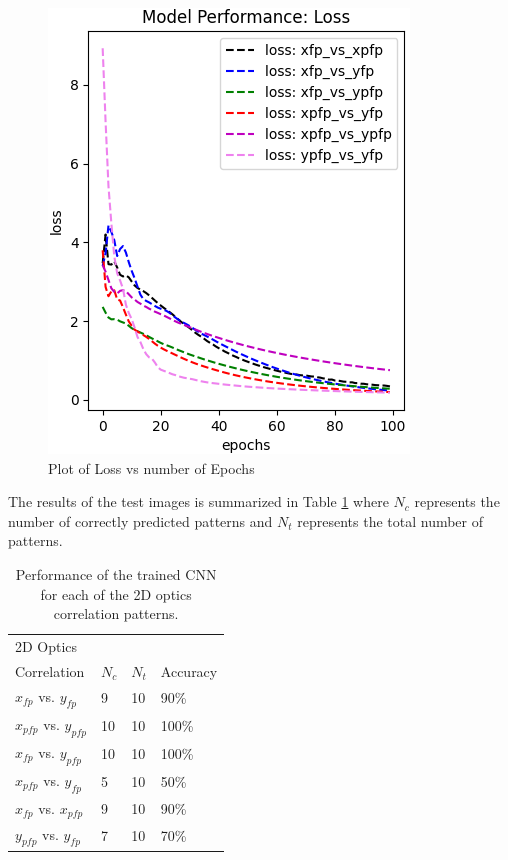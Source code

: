 \documentclass[conference]{IEEEtran}
\begin{document}
\begin{figure}[ht!]
  \centering
  \includegraphics[scale=0.6]{images/Results_part2.png}
  \caption{Plot of Loss vs number of Epochs}
  \label{fig:Results_part2}
\end{figure}

The results of the test images is summarized in Table  \ref{tab:results} where $N_{c}$ represents the number of correctly predicted patterns and $N_{t}$ represents the total number of patterns.
\begin{table}[h]
	\begin{center}
		\begin{tabular}{ p{2cm}p{1cm}p{1cm}p{1cm}  } %
                  \hline
                  2D Optics \\Correlation  & $N_{c}$  & $N_{t}$ & Accuracy \\ \hline \hline
	          $x_{fp}$ vs. $y_{fp}$ & 9 & 10 &  90\% \\
                   $x_{pfp}$ vs. $y_{pfp}$ & 10 & 10 & 100\%\\
                   $x_{fp}$ vs. $y_{pfp}$ & 10 & 10 & 100\%\\
                   $x_{pfp}$ vs. $y_{fp}$ & 5 & 10 & 50\%\\
                   $x_{fp}$ vs. $x_{pfp}$ & 9 & 10 & 90\%\\
                   $y_{pfp}$ vs. $y_{fp}$ & 7 & 10 & 70\%\\

                  

    
		  \hline 
		\end{tabular}
	\end{center}
	\caption{Performance of the trained CNN for each of the 2D optics correlation patterns.}
	\label{tab:results}
\end{table}
\end{document}
